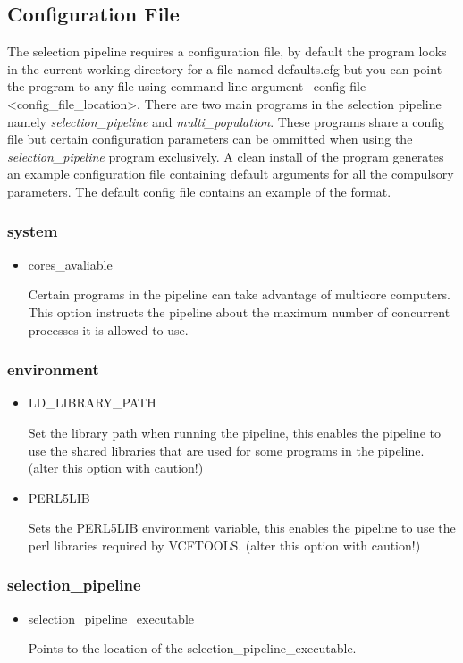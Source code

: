 \documentclass[a4paper,10pt]{article}
\begin{document}
\subsection{Configuration File}
The selection pipeline requires a configuration file, by default the program looks in the current working directory for a file named defaults.cfg but you can point the program to any file using command line argument --config-file <config\_file\_location>. There are two main programs in the selection pipeline namely \emph{selection\_pipeline} and \emph{multi\_population}. These programs share a config file but certain configuration parameters can be ommitted when using the \emph{selection\_pipeline} program exclusively. A clean install of the program generates an example configuration file containing default arguments for all the compulsory parameters. The default config file contains an example of the format.
\subsubsection{system}
\begin{itemize}
\item cores\_avaliable

Certain programs in the pipeline can take advantage of multicore computers. This option instructs the pipeline about the maximum number of concurrent processes it is allowed to use.
\end{itemize}
\subsubsection{environment}
\begin{itemize}
\item LD\_LIBRARY\_PATH

Set the library path when running the pipeline, this enables the pipeline to use the shared libraries that are used for some programs in the pipeline. (alter this option with caution!)
\item PERL5LIB

Sets the PERL5LIB environment variable, this enables the pipeline to use the perl libraries required by VCFTOOLS. (alter this option with caution!)
\end{itemize}
\subsubsection{selection\_pipeline}
\begin{itemize}
\item selection\_pipeline\_executable

Points to the location of the selection\_pipeline\_executable. 
\end{itemize}
\end{document}
